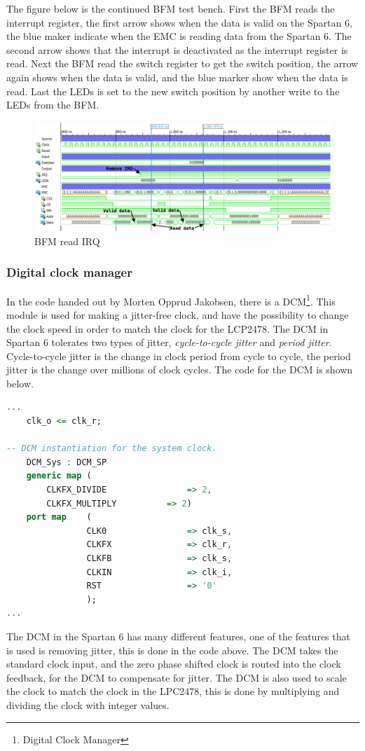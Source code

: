 The figure below is the continued BFM test bench. First the BFM reads the interrupt register, the first arrow shows when the data is valid on the Spartan 6, the blue maker indicate when the EMC is reading data from the Spartan 6. The second arrow shows that the interrupt is deactivated as the interrupt register is read. Next the BFM read the switch register to get the switch position, the arrow again shows when the data is valid, and the blue marker show when the data is read. Last the LEDs is set to the new switch position by another write to the LEDs from the BFM.
\begin{figure}[H]
	\begin{centering}
		\includegraphics[width=1.0\textwidth]{images/tb7_BFM_read_irq.eps}
		\caption{BFM read IRQ}
	\end{centering}
\end{figure}
\subsubsection{Digital clock manager}
In the code handed out by Morten Opprud Jakobsen, there is a DCM\footnote{Digital Clock Manager}. This module is used for making a jitter-free clock, and have the possibility to change the clock speed in order to match the clock for the LCP2478. The DCM in Spartan 6 tolerates two types of jitter, \textit{cycle-to-cycle jitter} and \textit{period jitter}. Cycle-to-cycle jitter is the change in clock period from cycle to cycle, the period jitter is the change over millions of clock cycles. The code for the DCM is shown below.
\begin{lstlisting}[language=VHDL, caption=DCM\_SP]
...
	clk_o <= clk_r;

-- DCM instantiation for the system clock.
	DCM_Sys : DCM_SP
	generic map (
		CLKFX_DIVIDE				=> 2,											-- Can be any integer from 1 to 32
		CLKFX_MULTIPLY			=> 2)											-- Can be any integer from 2 to 32
	port map	(
				CLK0				=> clk_s,											-- 0 degree DCM CLK ouptput
				CLKFX				=> clk_r,											-- DCM CLK synthesis out (M/D)
				CLKFB				=> clk_s,											-- DCM clock feedback
				CLKIN				=> clk_i,											-- Clock input (from IBUFG, BUFG or DCM)
				RST					=> '0'												-- DCM asynchronous reset input
				);
...
\end{lstlisting}
The DCM in the Spartan 6 has many different features, one of the features that is used is removing jitter, this is done in the code above. The DCM takes the standard clock input, and the zero phase shifted clock is routed into the clock feedback, for the DCM to compensate for jitter. The DCM is also used to scale the clock to match the clock in the LPC2478, this is done by multiplying and dividing the clock with integer values.
